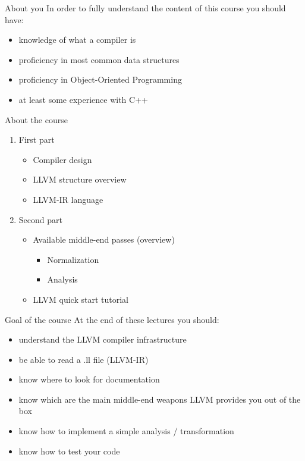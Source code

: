 \documentclass[10pt,mathserif]{beamer}
\begin{document}
\begin{frame}[t]{About you}
  In order to fully understand the content of this course you should have:
  \begin{itemize}
    \vfill
    \item knowledge of what a compiler is
    \vfill
    \item proficiency in most common data structures
    \vfill
    \item proficiency in Object-Oriented Programming
    \vfill
    \item at least some experience with C++
  \end{itemize}
\end{frame}

\begin{frame}[t]{About the course}
  \begin{Large}
  \vfill
  \begin{enumerate}
    \item First part
      \begin{itemize}
        \vfill
        \item Compiler design
        \vfill
        \item LLVM structure overview
        \vfill
        \item LLVM-IR language
    \end{itemize}
    \vfill
    \item Second part
      \begin{itemize}
        \item Available middle-end passes (overview)
        \vfill
        \begin{itemize}
          \item Normalization
        \vfill
          \item Analysis
        \end{itemize}
        \vfill
        \item LLVM quick start tutorial
      \end{itemize}
  \end{enumerate}
  \vfill
\end{Large}
\end{frame}

\begin{frame}[t]{Goal of the course}
  At the end of these lectures you should:
  \begin{itemize}
    \vfill
    \item understand the LLVM compiler infrastructure
    \vfill
    \item be able to read a .ll file (LLVM-IR)
    \vfill
    \item know where to look for documentation
    \vfill
    \item know which are the main middle-end weapons
          LLVM provides you out of the box
    \vfill
    \item know how to implement a simple analysis / transformation
    \vfill
    \item know how to test your code
  \end{itemize}
\end{frame}
\end{document}
